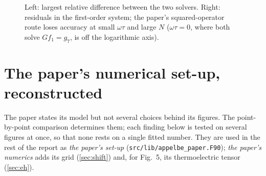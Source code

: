 \documentclass[11pt,a4paper]{article}
\newcommand{\R}{../results}
\newcommand{\ot}{\omega\tau}
\begin{document}
\begin{figure}[htb]\centering
{}
\caption{Left: largest relative difference between the two solvers. Right: residuals in the first-order system; the
paper's squared-operator route loses accuracy at small $\ot$ and large $N$ ($\ot=0$, where both solve $Gf_1=g_7$, is
off the logarithmic axis).}\label{fig:solvers}
\end{figure}

\section{The paper's numerical set-up, reconstructed}\label{sec:setup}
The paper states its model but not several choices behind its figures. The point-by-point comparison determines them;
each finding below is tested on several figures at once, so that none rests on a single fitted number. They are used in
the rest of the report as \emph{the paper's set-up} (\texttt{src/lib/appelbe\_paper.F90}); \emph{the paper's numerics} adds
its grid (\cref{sec:shift}) and, for Fig.~5, its thermoelectric tensor (\cref{sec:eh}).
\end{document}

